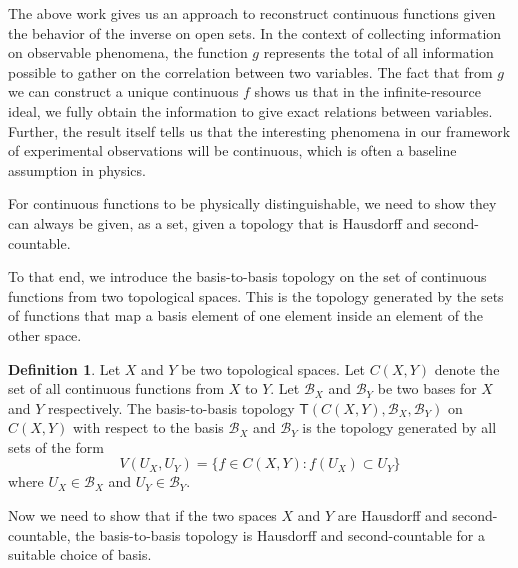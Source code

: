 \documentclass[review]{elsarticle}
\theoremstyle{plain}%
\theoremstyle{definition}
\newtheorem{defn}{Definition}[section]
\theoremstyle{remark}
\begin{document}
The above work gives us an approach to reconstruct continuous functions given the behavior of the inverse on open sets. In the context of collecting information on observable phenomena, the function $g$ represents the total of all information possible to gather on the correlation between two variables. The fact that from $g$ we can construct a unique continuous $f$ shows us that in the infinite-resource ideal, we fully obtain the information to give exact relations between variables. Further, the result itself tells us that the interesting phenomena in our framework of experimental observations will be continuous, which is often a baseline assumption in physics. 


For continuous functions to be physically distinguishable, we need to show they can always be given, as a set, given a topology that is Hausdorff and second-countable.

To that end, we introduce the basis-to-basis topology on the set of continuous functions from two topological spaces. This is the topology generated by the sets of functions that map a basis element of one element inside an element of the other space. 

\begin{defn} Let $X$ and $Y$ be two topological spaces. Let $C(X,Y)$ denote the set of all continuous functions from $X$ to $Y$. Let $\mathcal{B}_X$ and $\mathcal{B}_Y$ be two bases for $X$ and $Y$ respectively. The basis-to-basis topology $\mathsf{T}(C(X,Y), \mathcal{B}_X, \mathcal{B}_Y)$ on $C(X,Y)$ with respect to the basis $\mathcal{B}_X$ and $\mathcal{B}_Y$ is the topology generated by all sets of the form 
	$$
	V(U_X, U_Y) = \{f\in C(X,Y) : f(U_X)\subset U_Y\}
	$$
where $U_X \in \mathcal{B}_X$ and $U_Y \in \mathcal{B}_Y$.
\end{defn}

Now we need to show that if the two spaces $X$ and $Y$ are Hausdorff and second-countable, the basis-to-basis topology is Hausdorff and second-countable for a suitable choice of basis.
\end{document}
